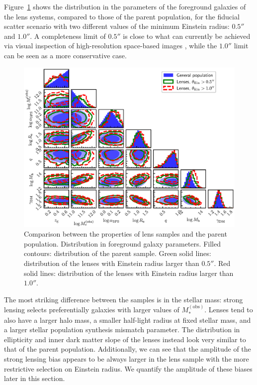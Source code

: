 \documentclass{aa}
\def\mobs{M_*^{(\mathrm{obs})}}
\def\Fref#1{Figure~\ref{#1}\xspace}
\begin{document}
\Fref{fig:lenspars} shows the distribution in the parameters of the foreground galaxies of the lens systems, compared to those of the parent population, for the fiducial scatter scenario with two different values of the minimum Einstein radius: $0.5''$ and $1.0''$.
A completeness limit of $0.5''$ is close to what can currently be achieved via visual inspection of high-resolution space-based images \citep{Gar++22}, while the $1.0''$ limit can be seen as a more conservative case.
\begin{figure}
\includegraphics[width=\textwidth]{lens_cornerplot.eps}
\caption{
Comparison between the properties of lens samples and the parent population. Distribution in foreground galaxy parameters.
Filled contours: distribution of the parent sample.
Green solid lines: distribution of the lenses with Einstein radius larger than $0.5''$.
Red solid lines: distribution of the lenses with Einstein radius larger than $1.0''$.
\label{fig:lenspars}
}
\end{figure}

The most striking difference between the samples is in the stellar mass: strong lensing selects preferentially galaxies with larger values of $\mobs$.
Lenses tend to also have a larger halo mass, a smaller half-light radius at fixed stellar mass, and a larger stellar population synthesis mismatch parameter. The distribution in ellipticity and inner dark matter slope of the lenses instead look very similar to that of the parent population.
Additionally, we can see that the amplitude of the strong lensing bias appears to be always larger in the lens sample with the more restrictive selection on Einstein radius.
We quantify the amplitude of these biases later in this section.
\end{document}
